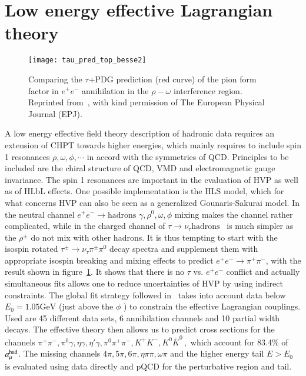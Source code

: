 \documentclass[epj,onecolumn]{webofc}
\newcommand{\gv}{\mbox{GeV}}
\newcommand{\ppm}{\pi^+ \pi^-}
\newcommand{\mbo}[1]{$#1$ }
\newcommand{\epm}{e^+e^- }
\newcommand{\epem}{e^+e^- }
\newcommand{\amuh}{a_\mu^{\rm had} }
\begin{document}
\section{Low energy effective Lagrangian theory}
\label{sec-4}
\begin{figure}[h]
\vspace*{-9mm}
\centering
\texttt{[image: tau\_pred\_top\_besse2]}
\caption{Comparing the $\tau$+PDG prediction (red curve) of the pion form factor
in $e^+ e^-$ annihilation in the $\rho-\omega$ interference
region. Reprinted from~\cite{Benayoun:2011mm}, with kind permission of
The European Physical Journal (EPJ).}
\label{fig:tautoepem}
\end{figure}
A low energy effective field theory description of hadronic data
requires an extension of CHPT towards higher energies, which mainly
requires to include spin 1 resonances \mbo{\rho,\omega,\phi,\cdots} in
accord with the symmetries of QCD. Principles to be included are the
chiral structure of QCD, VMD and electromagnetic gauge invariance. The
spin 1 resonances are important in the evaluation of HVP as well as
of HLbL effects. One possible implementation is the HLS model, which for
what concerns HVP can also be seen as a generalized Gounaris-Sakurai
model. In the neutral channel $\epm \to
\mathrm{hadrons}$
\mbo{\gamma,\rho^0,\omega,\phi} mixing makes the channel rather complicated, while in the
charged channel of $\tau \to \nu_\tau
\mathrm{hadrons}$~\cite{ALEPH,AlephCorr,OPAL,CLEO,Belle} is much simpler as
the $\rho^\pm$ do not mix with other hadrons. It is thus tempting to
start with the isospin rotated $\tau^\pm\to \nu_\tau \pi^\pm\pi^0$ decay
spectra and supplement them with appropriate isospin breaking and
mixing effects to predict $\epm \to\pi^+\pi^-$, with the result shown in
figure~\ref{fig:tautoepem}. It shows that there is no $\tau$ vs. $\epem$
conflict and actually simultaneous fits allows one to reduce uncertainties of
HVP by using indirect constraints. The global fit strategy followed
in~\cite{Benayoun:2011mm} takes into account data below
\mbo{E_0 = 1.05\gv} (just above the
\mbo{\phi}) to constrain the effective Lagrangian couplings. Used are 45
different data sets, 6 annihilation channels and 10 partial width
decays. The effective theory then allows us to predict cross sections
for the channels
\mbo{\ppm,\pi^0\gamma,\eta\gamma,\eta'\gamma,\pi^0\pi^+\pi^-,K^+K^-,K^0\bar{K}^0\,,}
which account for 83.4\% of $\amuh$. The missing channels
\mbo{4\pi,5\pi,6\pi,\eta\pi\pi,\omega\pi} and the higher energy tail
\mbo{E>E_0}
is evaluated using data directly and pQCD for the perturbative region and tail.
\end{document}
